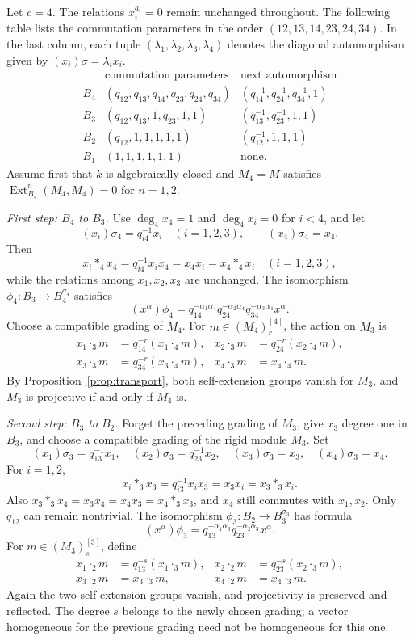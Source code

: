 \documentclass[11pt,a4paper]{article}
\numberwithin{equation}{section}
\theoremstyle{definition}
\theoremstyle{plain}
\theoremstyle{remark}
\DeclareMathOperator{\Ext}{Ext}
\begin{document}
Let \(c=4\). The relations \(x_i^{a_i}=0\) remain unchanged throughout.
The following table lists the commutation parameters in the order
\((12,13,14,23,24,34)\).
In the last column, each tuple
\((\lambda_1,\lambda_2,\lambda_3,\lambda_4)\)
denotes the diagonal automorphism given by
\((x_i)\sigma=\lambda_i x_i\).
\[
\begin{array}{c|c|c}
 &\text{commutation parameters}&\text{next automorphism}\\ \hline
 B_4&(q_{12},q_{13},q_{14},q_{23},q_{24},q_{34})
 &(q_{14}^{-1},q_{24}^{-1},q_{34}^{-1},1)\\
 B_3&(q_{12},q_{13},1,q_{23},1,1)&(q_{13}^{-1},q_{23}^{-1},1,1)\\
 B_2&(q_{12},1,1,1,1,1)&(q_{12}^{-1},1,1,1)\\
 B_1&(1,1,1,1,1,1)&\text{none}.
\end{array}
\]
Assume first that \(k\) is algebraically closed
and \(M_4=M\) satisfies \(\Ext_{B_4}^n(M_4,M_4)=0\) for \(n=1,2\).

\smallskip\noindent
\emph{First step: \(B_4\) to \(B_3\).}
Use \(\deg_4x_4=1\) and \(\deg_4x_i=0\) for \(i<4\), and let
\[
 (x_i)\sigma_4=q_{i4}^{-1}x_i\quad(i=1,2,3),\qquad
 (x_4)\sigma_4=x_4.
\]
Then
\[
 x_i*_4x_4=q_{i4}^{-1}x_ix_4=x_4x_i=x_4*_4x_i\quad(i=1,2,3),
\]
while the relations among \(x_1,x_2,x_3\) are unchanged. The isomorphism
\(\phi_4:B_3\to B_4^{\sigma_4}\) satisfies
\[
 (x^\alpha)\phi_4=
 q_{14}^{-\alpha_1\alpha_4}q_{24}^{-\alpha_2\alpha_4}
 q_{34}^{-\alpha_3\alpha_4}x^\alpha.
\]
Choose a compatible grading of \(M_4\). For
\(m\in(M_4)_r^{[4]}\), the action on \(M_3\) is
\[
\begin{aligned}
 x_1\cdot_3m&=q_{14}^{-r}(x_1\cdot_4m),&
 x_2\cdot_3m&=q_{24}^{-r}(x_2\cdot_4m),\\
 x_3\cdot_3m&=q_{34}^{-r}(x_3\cdot_4m),&
 x_4\cdot_3m&=x_4\cdot_4m.
\end{aligned}
\]
By Proposition~\ref{prop:transport}, both self-extension groups vanish
for \(M_3\), and \(M_3\) is projective if and only if \(M_4\) is.

\smallskip\noindent
\emph{Second step: \(B_3\) to \(B_2\).}
Forget the preceding grading of \(M_3\), give \(x_3\) degree one in
\(B_3\), and choose a compatible grading of the rigid module \(M_3\).
Set
\[
 (x_1)\sigma_3=q_{13}^{-1}x_1,\quad
 (x_2)\sigma_3=q_{23}^{-1}x_2,\quad
 (x_3)\sigma_3=x_3,\quad (x_4)\sigma_3=x_4.
\]
For \(i=1,2\),
\[
 x_i*_3x_3=q_{i3}^{-1}x_ix_3=x_3x_i=x_3*_3x_i.
\]
Also \(x_3*_3x_4=x_3x_4=x_4x_3=x_4*_3x_3\), and \(x_4\) still
commutes with \(x_1,x_2\). Only \(q_{12}\) can remain nontrivial.
The isomorphism \(\phi_3:B_2\to B_3^{\sigma_3}\) has formula
\[
 (x^\alpha)\phi_3=
 q_{13}^{-\alpha_1\alpha_3}q_{23}^{-\alpha_2\alpha_3}x^\alpha.
\]
For \(m\in(M_3)_s^{[3]}\), define
\[
\begin{aligned}
 x_1\cdot_2m&=q_{13}^{-s}(x_1\cdot_3m),&
 x_2\cdot_2m&=q_{23}^{-s}(x_2\cdot_3m),\\
 x_3\cdot_2m&=x_3\cdot_3m,&
 x_4\cdot_2m&=x_4\cdot_3m.
\end{aligned}
\]
Again the two self-extension groups vanish, and projectivity is
preserved and reflected. The degree \(s\) belongs to the newly chosen
grading; a vector homogeneous for the previous grading need not be
homogeneous for this one.
\end{document}
